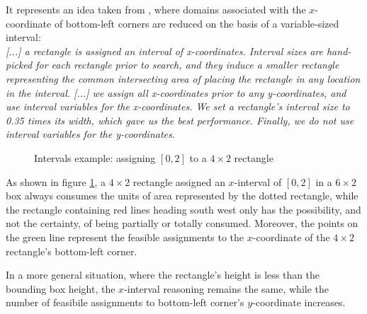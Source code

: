 \documentclass[a4paper,10pt]{article}
\newcounter{subsubsubsection}[subsubsection]
\begin{document}
 \label{sec:intervals-approach}
It represents an idea taken from \cite{rect-packing}, where domains associated with the $x$-coordinate of bottom-left corners are reduced on the basis of a variable-sized interval:\\
\emph{[...] a rectangle is assigned an interval of x-coordinates. Interval sizes are hand-picked for each rectangle prior to search, and they induce a smaller rectangle representing the common intersecting area of placing the rectangle in any location in the interval. [...] we assign all x-coordinates prior to any y-coordinates, and use interval variables for the x-coordinates. We set a rectangle’s interval size to 0.35 times its width, which gave us the best performance. Finally, we do not use interval variables for the y-coordinates.}

\begin{figure}[H]
   \centering
   \caption{Intervals example: assigning $[0,2]$ to a $4\times2$ rectangle}
   \label{fig:intervals}
\end{figure}

As shown in figure \ref{fig:intervals}, a $4\times2$ rectangle assigned an $x$-interval of $[0,2]$ in a $6\times2$ box always consumes the units of area represented by the dotted rectangle,
while the rectangle containing red lines heading south west only has the possibility, and not the certainty, of being partially or totally consumed.
Moreover, the points on the green line represent the feasible assignments to the $x$-coordinate of the $4\times2$ rectangle's bottom-left corner.

In a more general situation, where the rectangle's height is less than the bounding box height, the $x$-interval reasoning remains the same, while the number of feasibile assignments to bottom-left corner's $y$-coordinate increases.
\end{document}
